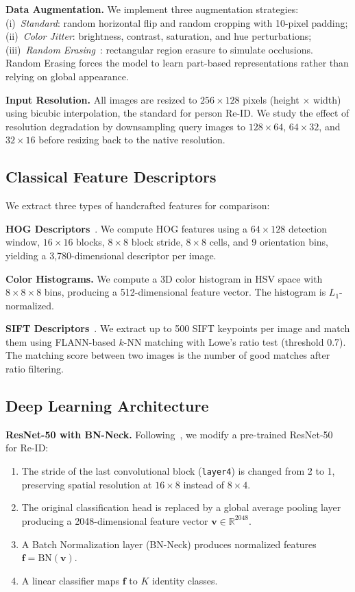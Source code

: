 \documentclass[final]{cvpr}
\begin{document}
\textbf{Data Augmentation.}
We implement three augmentation strategies:
(i)~\emph{Standard}: random horizontal flip and random cropping with 10-pixel padding;
(ii)~\emph{Color Jitter}: brightness, contrast, saturation, and hue perturbations;
(iii)~\emph{Random Erasing}~\cite{zhong2020random}: rectangular region erasure to simulate occlusions.
Random Erasing forces the model to learn part-based representations rather than relying on global appearance.

\textbf{Input Resolution.}
All images are resized to $256 \times 128$ pixels (height $\times$ width) using bicubic interpolation, the standard for person Re-ID.
We study the effect of resolution degradation by downsampling query images to $128 \times 64$, $64 \times 32$, and $32 \times 16$ before resizing back to the native resolution.

\subsection{Classical Feature Descriptors}

We extract three types of handcrafted features for comparison:

\textbf{HOG Descriptors}~\cite{dalal2005hog}.
We compute HOG features using a $64 \times 128$ detection window, $16 \times 16$ blocks, $8 \times 8$ block stride, $8 \times 8$ cells, and 9 orientation bins, yielding a 3,780-dimensional descriptor per image.

\textbf{Color Histograms.}
We compute a 3D color histogram in HSV space with $8 \times 8 \times 8$ bins, producing a 512-dimensional feature vector.
The histogram is $L_1$-normalized.

\textbf{SIFT Descriptors}~\cite{lowe2004sift}.
We extract up to 500 SIFT keypoints per image and match them using FLANN-based $k$-NN matching with Lowe's ratio test (threshold 0.7).
The matching score between two images is the number of good matches after ratio filtering.

\subsection{Deep Learning Architecture}

\textbf{ResNet-50 with BN-Neck.}
Following~\cite{luo2019bag}, we modify a pre-trained ResNet-50~\cite{he2016deep} for Re-ID:
\begin{enumerate}
    \item The stride of the last convolutional block (\texttt{layer4}) is changed from 2 to 1, preserving spatial resolution at $16 \times 8$ instead of $8 \times 4$.
    \item The original classification head is replaced by a global average pooling layer producing a 2048-dimensional feature vector $\mathbf{v} \in \mathbb{R}^{2048}$.
    \item A Batch Normalization layer (BN-Neck) produces normalized features $\mathbf{f} = \text{BN}(\mathbf{v})$.
    \item A linear classifier maps $\mathbf{f}$ to $K$ identity classes.
\end{enumerate}
\end{document}

